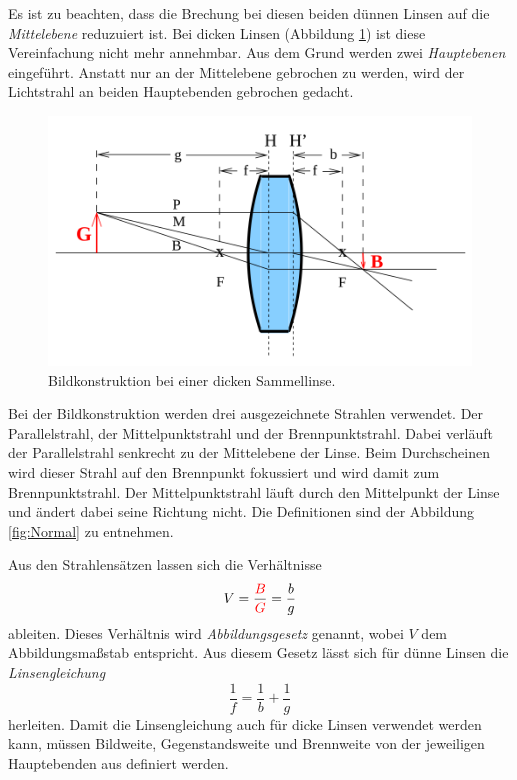 Es ist zu beachten, dass die Brechung bei diesen beiden dünnen Linsen auf die \textit{Mittelebene} reduzuiert ist. Bei dicken Linsen (Abbildung \ref{fig:Dick}) ist diese Vereinfachung nicht mehr annehmbar. Aus dem Grund werden zwei \textit{Hauptebenen} eingeführt. Anstatt nur an der Mittelebene gebrochen zu werden, wird der Lichtstrahl an beiden Hauptebenden gebrochen gedacht.

\begin{figure}
    \includegraphics[width=\textwidth]{data/Breite_Linse.png}
    \caption{Bildkonstruktion bei einer dicken Sammellinse.}
    \label{fig:Dick}
\end{figure}

Bei der Bildkonstruktion werden drei ausgezeichnete Strahlen verwendet. Der Parallelstrahl, der Mittelpunktstrahl und der Brennpunktstrahl. Dabei verläuft der Parallelstrahl senkrecht zu der Mittelebene der Linse. Beim Durchscheinen wird dieser Strahl auf den Brennpunkt fokussiert und wird damit zum Brennpunktstrahl. Der Mittelpunktstrahl läuft durch den Mittelpunkt der Linse und ändert dabei seine Richtung nicht. Die Definitionen sind der Abbildung \ref{fig:Normal} zu entnehmen. 

Aus den Strahlensätzen lassen sich die Verhältnisse 
\begin{equation}
    V=\frac{\textcolor{red}{B}}{\textcolor{red}{G}} = \frac{b}{g}
\end{equation}
ableiten. Dieses Verhältnis wird \textit{Abbildungsgesetz} genannt, wobei $V$ dem Abbildungsmaßstab entspricht. 
Aus diesem Gesetz lässt sich für dünne Linsen die \textit{Linsengleichung}
\begin{equation}
    \frac{1}{f}=\frac{1}{b}+\frac{1}{g}
    \label{eqn:linsengl}
\end{equation}
herleiten.
Damit die Linsengleichung auch für dicke Linsen verwendet werden kann, müssen Bildweite, Gegenstandsweite und Brennweite von der jeweiligen Hauptebenden aus definiert werden.


